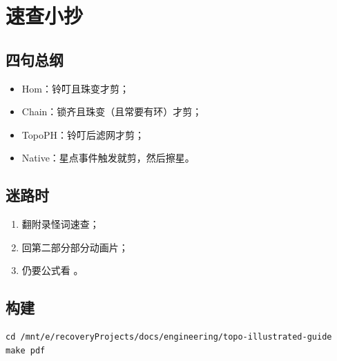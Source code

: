 \chapter{速查小抄}
\label{ch:cheat}

\section{四句总纲}

\begin{itemize}[nosep]
  \item Hom：铃叮且珠变才剪；
  \item Chain：锁齐且珠变（且常要有环）才剪；
  \item TopoPH：铃叮后滤网才剪；
  \item Native：星点事件触发就剪，然后擦星。
\end{itemize}

\section{迷路时}

\begin{enumerate}[nosep]
  \item 翻附录怪词速查；
  \item 回第二部分部分动画片；
  \item 仍要公式看 。
\end{enumerate}

\section{构建}

\begin{verbatim}
cd /mnt/e/recoveryProjects/docs/engineering/topo-illustrated-guide
make pdf
\end{verbatim}
